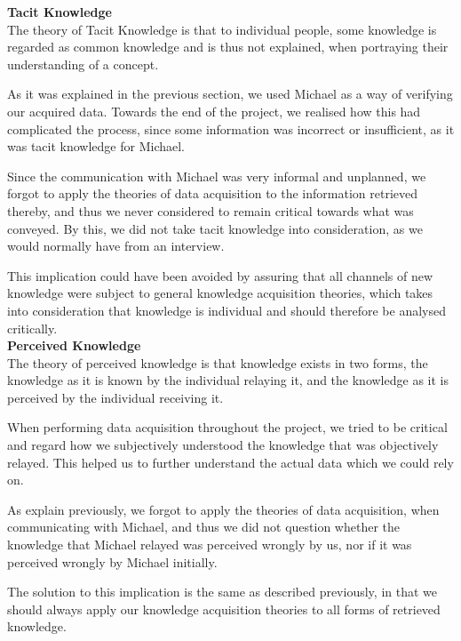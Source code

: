 \textbf{Tacit Knowledge}\\

The theory of Tacit Knowledge is that to individual people, some knowledge is regarded as common knowledge and is thus not explained, when portraying their understanding of a concept.

As it was explained in the previous section, we used Michael as a way of verifying our acquired data. Towards the end of the project, we realised how this had complicated the process, since some information was incorrect or insufficient, as it was tacit knowledge for Michael.

Since the communication with Michael was very informal and unplanned, we forgot to apply the theories of data acquisition to the information retrieved thereby, and thus we never considered to remain critical towards what was conveyed. By this, we did not take tacit knowledge into consideration, as we would normally have from an interview.

This implication could have been avoided by assuring that all channels of new knowledge were subject to general knowledge acquisition theories, which takes into consideration that knowledge is individual and should therefore be analysed critically.
\\

\textbf{Perceived Knowledge}\\

The theory of perceived knowledge is that knowledge exists in two forms, the knowledge as it is known by the individual relaying it, and the knowledge as it is perceived by the individual receiving it.

When performing data acquisition throughout the project, we tried to be critical and regard how we subjectively understood the knowledge that was objectively relayed. This helped us to further understand the actual data which we could rely on.

As explain previously, we forgot to apply the theories of data acquisition, when communicating with Michael, and thus we did not question whether the knowledge that Michael relayed was perceived wrongly by us, nor if it was perceived wrongly by Michael initially.

The solution to this implication is the same as described previously, in that we should always apply our knowledge acquisition theories to all forms of retrieved knowledge.
\\

